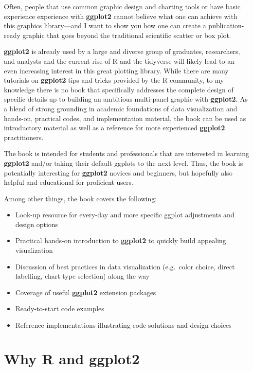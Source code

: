 \documentclass[
]{krantz}
\providecommand{\tightlist}{%
  \setlength{\itemsep}{0pt}\setlength{\parskip}{0pt}}
\begin{document}
Often, people that use common graphic design and charting tools or have basic experience experience with \textbf{ggplot2} cannot believe what one can achieve with this graphics library---and I want to show you how one can create a publication-ready graphic that goes beyond the traditional scientific scatter or box plot.

\textbf{ggplot2} is already used by a large and diverse group of graduates, researchers, and analysts and the current rise of R and the tidyverse will likely lead to an even increasing interest in this great plotting library. While there are many tutorials on \textbf{ggplot2} tips and tricks provided by the R community, to my knowledge there is no book that specifically addresses the complete design of specific details up to building an ambitious multi-panel graphic with \textbf{ggplot2}. As a blend of strong grounding in academic foundations of data visualization and hands-on, practical codes, and implementation material, the book can be used as introductory material as well as a reference for more experienced \textbf{ggplot2} practitioners.

The book is intended for students and professionals that are interested in learning \textbf{ggplot2} and/or taking their default ggplots to the next level. Thus, the book is potentially interesting for \textbf{ggplot2} novices and beginners, but hopefully also helpful and educational for proficient users.

Among other things, the book covers the following:

\begin{itemize}
\tightlist
\item
  Look-up resource for every-day and more specific ggplot adjustments and design options
\item
  Practical hands-on introduction to \textbf{ggplot2} to quickly build appealing visualization
\item
  Discussion of best practices in data visualization (e.g.~color choice, direct labelling, chart type selection) along the way
\item
  Coverage of useful \textbf{ggplot2} extension packages
\item
  Ready-to-start code examples
\item
  Reference implementations illustrating code solutions and design choices
\end{itemize}

\hypertarget{why-r-and-ggplot2}{%
\section*{\texorpdfstring{Why R and \textbf{ggplot2}}{Why R and ggplot2}}\label{why-r-and-ggplot2}}
\end{document}
